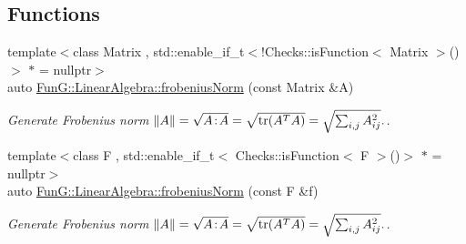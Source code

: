 \subsection*{\-Functions}
\begin{DoxyCompactItemize}
\item 
{\footnotesize template$<$class Matrix , std\-::enable\-\_\-if\-\_\-t$<$!\-Checks\-::is\-Function$<$ Matrix $>$()$>$ $\ast$  = nullptr$>$ }\\auto \hyperlink{group__LinearAlgebraGroup_gaa893e7d667dde98d2b119ca004745186}{\-Fun\-G\-::\-Linear\-Algebra\-::frobenius\-Norm} (const \-Matrix \&\-A)
\begin{DoxyCompactList}\small\item\em \-Generate \-Frobenius norm $ \|A\| = \sqrt{A\negthinspace : \negthinspace A }= \sqrt{\mathrm{tr}(A^TA)} = \sqrt{\sum_{i,j} A_{ij}^2}. $. \end{DoxyCompactList}\item 
{\footnotesize template$<$class F , std\-::enable\-\_\-if\-\_\-t$<$ Checks\-::is\-Function$<$ F $>$()$>$ $\ast$  = nullptr$>$ }\\auto \hyperlink{group__LinearAlgebraGroup_gafa2f358f9310cecb787620ad8ec460a6}{\-Fun\-G\-::\-Linear\-Algebra\-::frobenius\-Norm} (const \-F \&f)
\begin{DoxyCompactList}\small\item\em \-Generate \-Frobenius norm $ \|A\| = \sqrt{A\negthinspace : \negthinspace A }= \sqrt{\mathrm{tr}(A^TA)} = \sqrt{\sum_{i,j} A_{ij}^2}. $. \end{DoxyCompactList}\end{DoxyCompactItemize}
